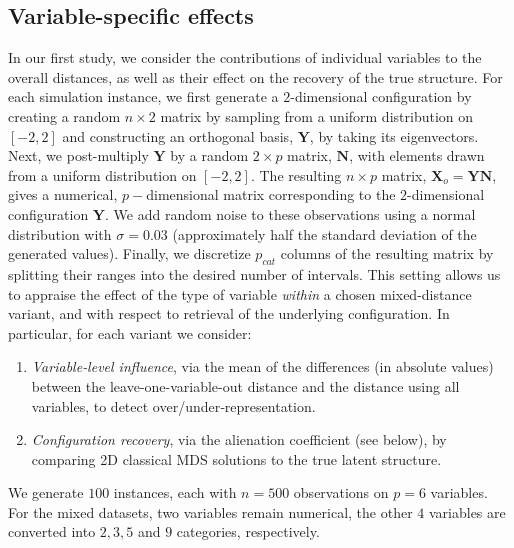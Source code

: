 \documentclass[12pt]{article}
\begin{document}
\subsection{Variable-specific effects}\label{sect:varspecific}
In our first study, we consider the contributions of individual variables to the overall distances, as well as their effect on the recovery of the true structure. For each simulation instance, we first generate a $2$-dimensional configuration by creating a random $n \times 2$ matrix by sampling from a uniform distribution on $[-2,2]$ and constructing an orthogonal basis,  $\mathbf{Y}$, by taking its eigenvectors. Next, we post-multiply $\mathbf{Y}$ by a random $2 \times p$ matrix, $\mathbf{N}$, with elements drawn from a uniform distribution on $[-2, 2]$. The resulting $n \times p$ matrix, $\mathbf{X}_o = \mathbf{YN}$, gives a numerical, $p-$dimensional  matrix corresponding to the $2$-dimensional configuration $\mathbf{Y}$. We add random noise to these observations using a normal distribution with $\sigma = 0.03$ (approximately half the standard deviation of the generated values). Finally, we discretize $p_{cat}$ columns of the resulting matrix by splitting their ranges into the desired number of intervals. This setting allows us to appraise the effect of the type of variable \emph{within} a chosen mixed-distance variant, and with respect to retrieval of the underlying configuration. In particular, for each variant we consider:
\begin{enumerate}
\item \emph{Variable‐level influence}, via the mean of the differences (in absolute values) between the leave-one-variable-out distance and the distance using all variables, to detect over/under‐representation.
\item \emph{Configuration recovery}, via the alienation coefficient (see below), by comparing 2D classical MDS solutions to the true latent structure.
\end{enumerate}

We generate $100$ instances, each with $n=500$ observations on $p=6$ variables. For the mixed datasets, two variables remain numerical, the other $4$ variables are converted into $2, 3, 5$ and $9$ categories, respectively.
\end{document}
